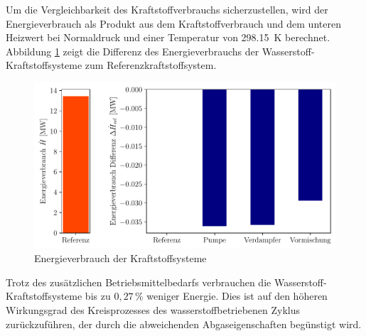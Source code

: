 Um die Vergleichbarkeit des Kraftstoffverbrauchs sicherzustellen, wird der Energieverbrauch als Produkt aus dem Kraftstoffverbrauch und dem unteren Heizwert bei Normaldruck und einer Temperatur von \SI{298.15}{\K} berechnet.
Abbildung \ref{fig:refenergy} zeigt die Differenz des Energieverbrauchs der Wasserstoff-Kraftstoffsysteme zum Referenzkraftstoffsystem. 

\begin{figure}[ht]
\centering
\includegraphics[width=1\linewidth]{4_Abbildungen/2_Hauptteil/Ergebnisse/refenergy.pdf}
  \caption{Energieverbrauch der Kraftstoffsysteme}
  \label{fig:refenergy}
\end{figure}
\FloatBarrier

Trotz des zusätzlichen Betriebsmittelbedarfs verbrauchen die Wasserstoff-Kraftstoffsysteme bis zu $0{,}27\,\%$ weniger Energie. Dies ist auf den höheren Wirkungsgrad des Kreisprozesses des wasserstoffbetriebenen Zyklus zurückzuführen, der durch die abweichenden Abgaseigenschaften begünstigt wird.